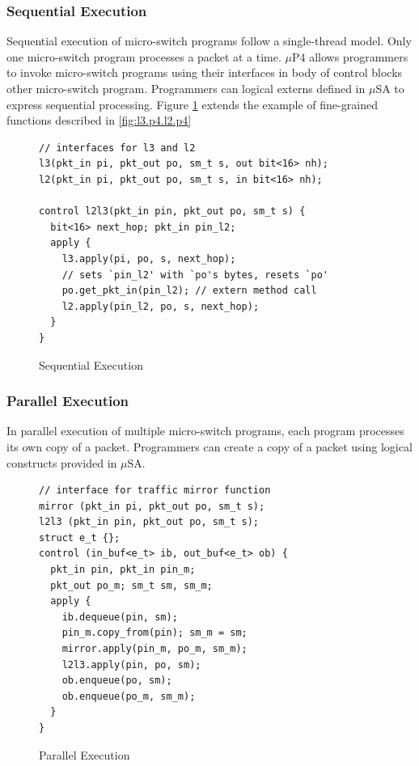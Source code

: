 \subsubsection{Sequential Execution}
Sequential execution of micro-switch programs follow a single-thread model.
Only one micro-switch program processes a packet at a time.
$\mu$P4 allows programmers to invoke micro-switch programs using their interfaces in body of control blocks other micro-switch program.
Programmers can logical externs defined in $\mu$SA to express sequential processing.
Figure \ref{fig:sequential-execution} extends the example of fine-grained functions described in \ref{fig:l3.p4.l2.p4}
 \begin{figure}[ht]
\begin{lstlisting}[frame=none]
// interfaces for l3 and l2
l3(pkt_in pi, pkt_out po, sm_t s, out bit<16> nh);
l2(pkt_in pi, pkt_out po, sm_t s, in bit<16> nh);

control l2l3(pkt_in pin, pkt_out po, sm_t s) {
  bit<16> next_hop; pkt_in pin_l2;
  apply {
    l3.apply(pi, po, s, next_hop);
    // sets `pin_l2' with `po's bytes, resets `po'
    po.get_pkt_in(pin_l2); // extern method call
    l2.apply(pin_l2, po, s, next_hop);
  }
}
\end{lstlisting}
\caption{Sequential Execution}
\label{fig:sequential-execution}
\end{figure}






\subsubsection{Parallel Execution}
In parallel execution of multiple micro-switch programs, each program processes its own copy of a packet.
Programmers can create a copy of a packet using logical constructs provided in $\mu$SA. 


\begin{figure}[ht]
\begin{lstlisting}[frame=none]
// interface for traffic mirror function
mirror (pkt_in pi, pkt_out po, sm_t s);
l2l3 (pkt_in pin, pkt_out po, sm_t s);
struct e_t {};
control (in_buf<e_t> ib, out_buf<e_t> ob) {
  pkt_in pin, pkt_in pin_m;
  pkt_out po_m; sm_t sm, sm_m;
  apply {
    ib.dequeue(pin, sm);
    pin_m.copy_from(pin); sm_m = sm; 
    mirror.apply(pin_m, po_m, sm_m);
    l2l3.apply(pin, po, sm);
    ob.enqueue(po, sm);
    ob.enqueue(po_m, sm_m);
  }
}
\end{lstlisting}
\caption{Parallel Execution}
\label{fig:parallel-execution}
\end{figure}

